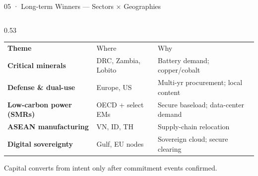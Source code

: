 \documentclass[aspectratio=169,10pt]{beamer}
\begin{document}
\begin{frame}{05 · Long-term Winners — Sectors × Geographies}
\begin{columns}[T,totalwidth=\textwidth]

\begin{column}{0.53\textwidth}
\renewcommand{\arraystretch}{1.30}
\setlength{\tabcolsep}{3pt}
\begin{tabular}{>{\scriptsize\bfseries}p{2.42cm}%
                >{\scriptsize}p{1.65cm}%
                >{\scriptsize}p{2.42cm}}
  \rowcolor{navy}
    \color{white}Theme & \color{white}Where & \color{white}Why \\
  \rowcolor{ice}
    Critical minerals & DRC, Zambia, Lobito & Battery demand; copper/cobalt \\
  Defense \& dual-use & Europe, US & Multi-yr procurement; local content \\
  \rowcolor{ice}
    Low-carbon power (SMRs) & OECD + select EMs &
    Secure baseload; data-center demand \\
  ASEAN manufacturing & VN, ID, TH & Supply-chain relocation \\
  \rowcolor{ice}
    Digital sovereignty & Gulf, EU nodes & Sovereign cloud; secure clearing \\
\end{tabular}
\vspace{4pt}
{\footnotesize\color{coal}
  Capital converts from intent only after commitment events confirmed.}
\end{column}


\end{columns}
\end{frame}
\end{document}

